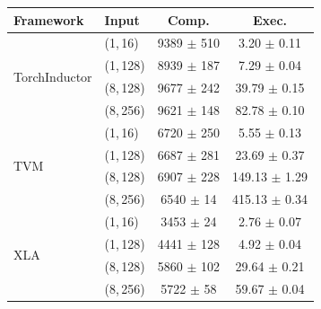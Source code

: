 \begin{tabular}{llcc}
\toprule
\textbf{Framework} & \textbf{Input} & \textbf{Comp.} & \textbf{Exec.} \\
\midrule
\multirow{4}{*}{TorchInductor}
& (1,\,16) & 9389 $\pm$ 510 & 3.20 $\pm$ 0.11 \\
& (1,\,128) & 8939 $\pm$ 187 & 7.29 $\pm$ 0.04 \\
& (8,\,128) & 9677 $\pm$ 242 & 39.79 $\pm$ 0.15 \\
& (8,\,256) & 9621 $\pm$ 148 & 82.78 $\pm$ 0.10 \\
\midrule
\multirow{4}{*}{TVM}
& (1,\,16) & 6720 $\pm$ 250 & 5.55 $\pm$ 0.13 \\
& (1,\,128) & 6687 $\pm$ 281 & 23.69 $\pm$ 0.37 \\
& (8,\,128) & 6907 $\pm$ 228 & 149.13 $\pm$ 1.29 \\
& (8,\,256) & 6540 $\pm$ 14 & 415.13 $\pm$ 0.34 \\
\midrule
\multirow{4}{*}{XLA}
& (1,\,16) & 3453 $\pm$ 24 & 2.76 $\pm$ 0.07 \\
& (1,\,128) & 4441 $\pm$ 128 & 4.92 $\pm$ 0.04 \\
& (8,\,128) & 5860 $\pm$ 102 & 29.64 $\pm$ 0.21 \\
& (8,\,256) & 5722 $\pm$ 58 & 59.67 $\pm$ 0.04 \\
\bottomrule
\end{tabular}
